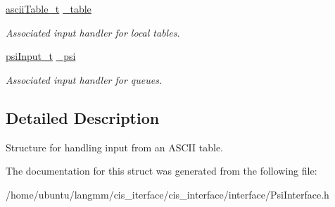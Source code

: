 \begin{DoxyCompactItemize}
\mbox{\label{structpsiAsciiTableInput__t_ab3f77107765211a9ea744eb178ff9b87}} 
\hyperlink{structasciiTable__t}{ascii\+Table\+\_\+t} \hyperlink{structpsiAsciiTableInput__t_ab3f77107765211a9ea744eb178ff9b87}{\+\_\+table}
\begin{DoxyCompactList}\small\item\em Associated input handler for local tables. \end{DoxyCompactList}\item 
\mbox{\label{structpsiAsciiTableInput__t_a0e5c09b570c4bd0b19c1049e0795f258}} 
\hyperlink{structpsiInput__t}{psi\+Input\+\_\+t} \hyperlink{structpsiAsciiTableInput__t_a0e5c09b570c4bd0b19c1049e0795f258}{\+\_\+psi}
\begin{DoxyCompactList}\small\item\em Associated input handler for queues. \end{DoxyCompactList}\end{DoxyCompactItemize}


\subsection{Detailed Description}
Structure for handling input from an A\+S\+C\+II table. 

The documentation for this struct was generated from the following file\+:\begin{DoxyCompactItemize}
\item 
/home/ubuntu/langmm/cis\+\_\+iterface/cis\+\_\+interface/interface/Psi\+Interface.\+h\end{DoxyCompactItemize}
